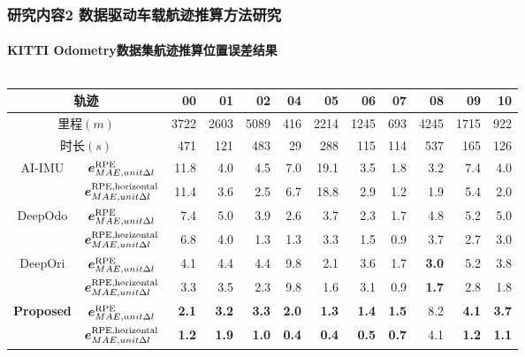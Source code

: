 \begin{frame} 
 	\frametitle{研究内容2 数据驱动车载航迹推算方法研究}
 	\framesubtitle{KITTI Odometry数据集航迹推算位置误差结果}
	\vspace{-0.2cm}
	\begin{columns}[t]
		\begin{column}{0.6\textwidth}
			{   
				\tiny   
				\setlength{\tabcolsep}{2pt}     
				\begin{tabular*}{\linewidth}{@{\extracolsep{\fill}}ccrrrrrrrrrr}
					\toprule
		            \multicolumn{2}{c}{轨迹} & 00 & 01 & 02 & 04 & 05 & 06 & 07 & 08 & 09 & 10 \\
					\midrule
					\multicolumn{2}{c}{里程$\left(\unit{m}\right)$} & 3722 & 2603 & 5089 & 416 & 2214 & 1245 & 693 & 4245 & 1715 & 922 \\
					\multicolumn{2}{c}{时长$\left(\unit{s}\right)$} &  471 &  121 &  483 &  29 &  288 &  115 & 114 &  537 &  165 & 126 \\
					\multirow{2}{*}{AI-IMU}            & $\vb*{e}^{\mathrm{RPE}}_{MAE,unit \Delta l}$ & 11.8 & 4.0 & 4.5 & 7.0 & 19.1 & 3.5 & 1.8 & 3.2 & 7.4 & 4.0 \\
					                                   & $\vb*{e}^{\mathrm{RPE,horizontal}}_{MAE,unit \Delta l}$ & 11.4 & 3.6 & 2.5 & 6.7 & 18.8 & 2.9 & 1.2 & 1.9 & 5.4 & 2.0 \\
					\multirow{2}{*}{DeepOdo}           & $\vb*{e}^{\mathrm{RPE}}_{MAE,unit \Delta l}$ & 7.4 & 5.0 & 3.9 & 2.6 & 3.7 & 2.3 & 1.7 & 4.8 & 5.2 & 5.0 \\
					                                   & $\vb*{e}^{\mathrm{RPE,horizontal}}_{MAE,unit \Delta l}$ & 6.8 & 4.0 & 1.3 & 1.3 & 3.3 & 1.5 & 0.9 & 3.7 & 2.7 & 3.0 \\
					\multirow{2}{*}{DeepOri}           & $\vb*{e}^{\mathrm{RPE}}_{MAE,unit \Delta l}$ & 4.1 & 4.4 & 4.4 & 9.8 & 2.1 & 3.6 & 1.7 & \textbf{3.0} & 5.2 & 3.8 \\
					                                   & $\vb*{e}^{\mathrm{RPE,horizontal}}_{MAE,unit \Delta l}$ & 3.3 & 3.5 & 2.3 & 9.8 & 1.6 & 3.1 & 0.9 & \textbf{1.7} & 2.8 & 1.8 \\
					\multirow{2}{*}{\textbf{Proposed}} & $\vb*{e}^{\mathrm{RPE}}_{MAE,unit \Delta l}$ & \textbf{2.1} & \textbf{3.2} & \textbf{3.3} & \textbf{2.0} & \textbf{1.3} & \textbf{1.4} & \textbf{1.5} & 8.2 & \textbf{4.1} & \textbf{3.7} \\
					                                   & $\vb*{e}^{\mathrm{RPE,horizontal}}_{MAE,unit \Delta l}$ & \textbf{1.2} & \textbf{1.9} & \textbf{1.0} & \textbf{0.4} & \textbf{0.4} & \textbf{0.5} & \textbf{0.7} & 4.1 & \textbf{1.2} & \textbf{1.1} \\

\end{tabular*}}
\end{column}
\end{columns}
\end{frame}
